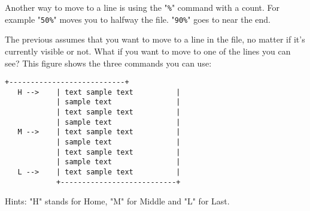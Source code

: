Another way to move to a line is using the "\verb!%!" command with a count. 
For example "\verb!50%!" moves you to halfway the file.
"\verb!90%!" goes to near the end.

The previous assumes that you want to move to a line in the file, no matter if it's currently visible or not.
What if you want to move to one of the lines you can see?
This figure shows the three commands you can use:

\begin{Verbatim}[samepage=true]
            +---------------------------+
   H -->    | text sample text          |
            | sample text               |
            | text sample text          |
            | sample text               |
   M -->    | text sample text          |
            | sample text               |
            | text sample text          |
            | sample text               |
   L -->    | text sample text          |
            +---------------------------+
\end{Verbatim}

Hints: "H" stands for Home, "M" for Middle and "L" for Last.

